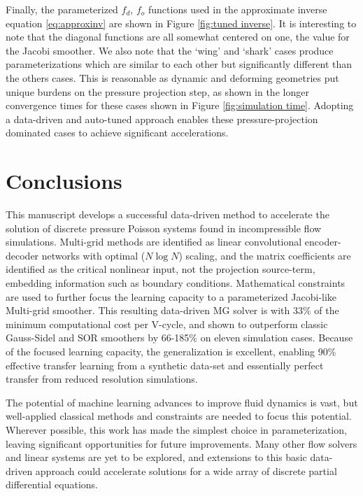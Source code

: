 \documentclass[review]{elsarticle}
\begin{document}
Finally, the parameterized $f_d,\,f_o$ functions used in the approximate inverse equation \ref{eq:approxinv} are shown in Figure \ref{fig:tuned inverse}. It is interesting to note that the diagonal functions are all somewhat centered on one, the value for the Jacobi smoother. We also note that the `wing' and `shark' cases produce parameterizations which are similar to each other but significantly different than the others cases. This is reasonable as dynamic and deforming geometries put unique burdens on the pressure projection step, as shown in the longer convergence times for these cases shown in Figure \ref{fig:simulation time}. Adopting a data-driven and auto-tuned approach enables these pressure-projection dominated cases to achieve significant accelerations.

\section{Conclusions}

This manuscript develops a successful data-driven method to accelerate the solution of discrete pressure Poisson systems found in incompressible flow simulations. Multi-grid methods are identified as linear convolutional encoder-decoder networks with optimal ($N\log N$) scaling, and the matrix coefficients are identified as the critical nonlinear input, not the projection source-term, embedding information such as boundary conditions. Mathematical constraints are used to further focus the learning capacity to a parameterized Jacobi-like Multi-grid smoother. This resulting data-driven MG solver is with 33\% of the minimum computational cost per V-cycle, and shown to outperform classic Gauss-Sidel and SOR smoothers by 66-185\% on eleven simulation cases. Because of the focused learning capacity, the generalization is excellent, enabling 90\% effective transfer learning from a synthetic data-set and essentially perfect transfer from reduced resolution simulations. 

The potential of machine learning advances to improve fluid dynamics is vast, but well-applied classical methods and constraints are needed to focus this potential. Wherever possible, this work has made the simplest choice in parameterization, leaving significant opportunities for future improvements. Many other flow solvers and linear systems are yet to be explored, and extensions to this basic data-driven approach could accelerate solutions for a wide array of discrete partial differential equations. 



\end{document}
